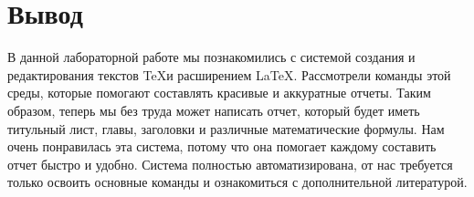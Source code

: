 \documentclass[10pt,a4paper]{report}
\begin{document}
\chapter{Вывод}
В данной лабораторной работе мы познакомились  с системой создания и редактирования текстов \TeX и расширением \LaTeX. Рассмотрели команды этой среды, которые помогают составлять красивые и аккуратные отчеты.
Таким образом, теперь мы без труда может написать отчет, который будет иметь титульный лист, главы, заголовки и различные математические формулы. Нам очень понравилась эта система, потому что она помогает каждому составить отчет быстро и удобно. Система полностью автоматизирована, от нас требуется только освоить основные команды и ознакомиться с дополнительной литературой.
\end{document}
